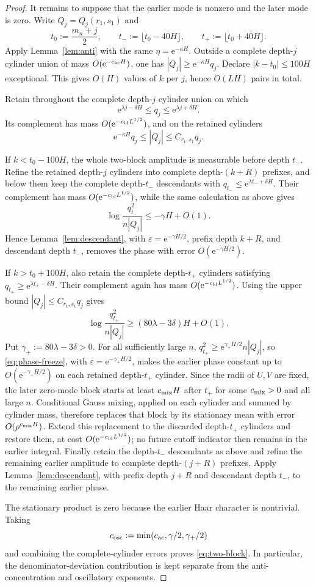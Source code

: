 \documentclass[11pt,a4paper]{amsart}
\theoremstyle{definition}
\theoremstyle{remark}
\newcommand{\e}{\mathrm e}
\begin{document}
\begin{proof}
It remains to suppose that the earlier mode is nonzero and the later mode is
zero.  Write $Q_j=Q_j(r_1,s_1)$ and
\[
 t_0:=\frac{m_n+j}{2},\qquad
 t_-:=\lfloor t_0-40H\rfloor,
 \qquad t_+:=\lfloor t_0+40H\rfloor.
\]
Apply Lemma~\ref{lem:anti} with the same
$\eta=\e^{-\kappa H}$.  Outside a complete depth-$j$ cylinder union of mass
$O(\e^{-c_{\rm ac}H})$, one has
$|Q_j|\ge\e^{-\kappa H}q_j$.  Declare
$|k-t_0|\le100H$ exceptional.  This gives $O(H)$ values of $k$ per $j$,
hence $O(LH)$ pairs in total.

Retain throughout the complete depth-$j$ cylinder union on which
\[
 \e^{\lambda j-\delta H}\le q_j\le\e^{\lambda j+\delta H}.
\]
Its complement has mass $O(\e^{-c_{\rm ld}L^{1/2}})$, and on the retained
cylinders
\[
 \e^{-\kappa H}q_j\le |Q_j|\le C_{r_1,s_1}q_j.
\]

If $k<t_0-100H$, the whole two-block amplitude is measurable before depth
$t_-$.  Refine the retained depth-$j$ cylinders into complete
depth-$(k+R)$ prefixes, and below them keep the complete
depth-$t_-$ descendants with $q_{t_-}\le\e^{\lambda t_-+\delta H}$.  Their
complement has mass $O(\e^{-c_{\rm ld}L^{1/2}})$, while the same calculation
as above gives
\[
 \log\frac{q_{t_-}^2}{n|Q_j|}\le-\gamma H+O(1).
\]
Hence Lemma~\ref{lem:descendant}, with
$\varepsilon=\e^{-\gamma H/2}$, prefix depth $k+R$, and descendant depth
$t_-$, removes the phase with error
$O(\e^{-\gamma H/2})$.

If $k>t_0+100H$, also retain the complete depth-$t_+$ cylinders satisfying
$q_{t_+}\ge\e^{\lambda t_+-\delta H}$.  Their complement again has mass
$O(\e^{-c_{\rm ld}L^{1/2}})$.  Using the upper bound
$|Q_j|\le C_{r_1,s_1}q_j$ gives
\[
 \log\frac{q_{t_+}^2}{n|Q_j|}
 \ge(80\lambda-3\delta)H+O(1).
\]
Put $\gamma_+:=80\lambda-3\delta>0$.  For all sufficiently large $n$,
$q_{t_+}^2\ge\e^{\gamma_+H/2}n|Q_j|$, so
\eqref{eq:phase-freeze}, with $\varepsilon=\e^{-\gamma_+H/2}$, makes the
earlier phase constant up to $O(\e^{-\gamma_+H/2})$ on each retained
depth-$t_+$ cylinder.  Since the radii of $U,V$ are fixed, the later
zero-mode block starts at least $c_{\rm mix}H$ after $t_+$ for some
$c_{\rm mix}>0$ and all large $n$.  Conditional Gauss mixing, applied on
each cylinder and summed by cylinder mass, therefore replaces that block by
its stationary mean with error $O(\rho^{c_{\rm mix}H})$.  Extend this
replacement to the discarded depth-$t_+$ cylinders and restore them, at cost
$O(\e^{-c_{\rm ld}L^{1/2}})$; no future cutoff indicator then remains in the
earlier integral.  Finally retain the depth-$t_-$ descendants as above and
refine the remaining earlier amplitude to complete depth-$(j+R)$ prefixes.
Apply Lemma~\ref{lem:descendant}, with prefix depth $j+R$ and descendant
depth $t_-$, to the remaining earlier phase.

The stationary product is zero because the earlier Haar character is
nontrivial.  Taking
\[
 c_{\rm osc}:=\min(c_{\rm ac},\gamma/2,\gamma_+/2)
\]
and combining the complete-cylinder errors proves \eqref{eq:two-block}.
In particular, the denominator-deviation contribution is kept separate from
the anti-concentration and oscillatory exponents.
\end{proof}
\end{document}
